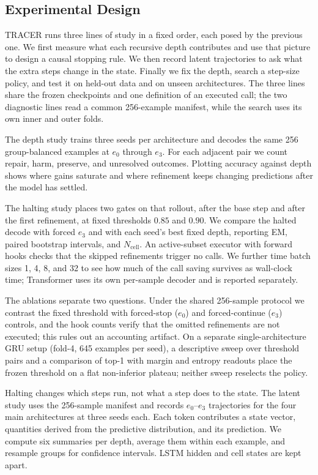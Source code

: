 \documentclass[11pt]{article}
\begin{document}
\subsection{Experimental Design}
TRACER runs three lines of study in a fixed order, each posed by the previous one. We first measure what each recursive depth contributes and use that picture to design a causal stopping rule. We then record latent trajectories to ask what the extra steps change in the state. Finally we fix the depth, search a step-size policy, and test it on held-out data and on unseen architectures. The three lines share the frozen checkpoints and one definition of an executed call; the two diagnostic lines read a common 256-example manifest, while the search uses its own inner and outer folds.

The depth study trains three seeds per architecture and decodes the same 256 group-balanced examples at $e_0$ through $e_3$. For each adjacent pair we count repair, harm, preserve, and unresolved outcomes. Plotting accuracy against depth shows where gains saturate and where refinement keeps changing predictions after the model has settled.

The halting study places two gates on that rollout, after the base step and after the first refinement, at fixed thresholds $0.85$ and $0.90$. We compare the halted decode with forced $e_3$ and with each seed's best fixed depth, reporting EM, paired bootstrap intervals, and $N_{\mathrm{cell}}$. An active-subset executor with forward hooks checks that the skipped refinements trigger no calls. We further time batch sizes 1, 4, 8, and 32 to see how much of the call saving survives as wall-clock time; Transformer uses its own per-sample decoder and is reported separately.

The ablations separate two questions. Under the shared 256-sample protocol we contrast the fixed threshold with forced-stop ($e_0$) and forced-continue ($e_3$) controls, and the hook counts verify that the omitted refinements are not executed; this rules out an accounting artifact. On a separate single-architecture GRU setup (fold-4, 645 examples per seed), a descriptive sweep over threshold pairs and a comparison of top-1 with margin and entropy readouts place the frozen threshold on a flat non-inferior plateau; neither sweep reselects the policy.

Halting changes which steps run, not what a step does to the state. The latent study uses the 256-sample manifest and records $e_0$--$e_3$ trajectories for the four main architectures at three seeds each. Each token contributes a state vector, quantities derived from the predictive distribution, and its prediction. We compute six summaries per depth, average them within each example, and resample groups for confidence intervals. LSTM hidden and cell states are kept apart.
\end{document}
